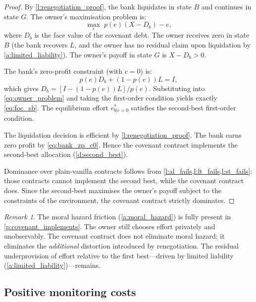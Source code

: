 \documentclass[12pt,a4paper]{article}
\theoremstyle{plain}
\theoremstyle{definition}
\theoremstyle{remark}
\newtheorem{remark}[theorem]{Remark}
\begin{document}
\begin{proof}
By \cref{l:renegotiation_proof}, the bank liquidates in state $B$ and continues in
state $G$. The owner's maximisation problem is:
\begin{equation}
  \max_{e} \; p(e)(X - D_b) - e,
  \label{eq:owner_problem}
\end{equation}
where $D_b$ is the face value of the covenant debt. The owner receives zero in state
$B$ (the bank recovers $L$, and the owner has no residual claim upon liquidation by
\cref{a:limited_liability}). The owner's payoff in state $G$ is $X - D_b > 0$.

The bank's zero-profit constraint (with $c = 0$) is:
\begin{equation}
  p(e) D_b + (1-p(e)) L = I,
  \label{eq:bank_zp_c0}
\end{equation}
which gives $D_b = [I - (1-p(e))L]/p(e)$. Substituting into \cref{eq:owner_problem}
and taking the first-order condition yields exactly \cref{eq:foc_sb}. The equilibrium
effort $e^*_{b|c=0}$ satisfies the second-best first-order condition.

The liquidation decision is efficient by \cref{l:renegotiation_proof}. The bank earns
zero profit by \cref{eq:bank_zp_c0}. Hence the covenant contract implements the
second-best allocation (\cref{d:second_best}).

Dominance over plain-vanilla contracts follows from \cref{l:al_fails,l:lt_fails,l:st_fails}:
those contracts cannot implement the second best, while the covenant contract does.
Since the second-best maximises the owner's payoff subject to the constraints of the
environment, the covenant contract strictly dominates.
\end{proof}

\begin{remark}
\label{r:moral_hazard_survives}
The moral hazard friction (\cref{a:moral_hazard}) is fully present in
\cref{p:covenant_implements}. The owner still chooses effort privately and
unobservably. The covenant contract does not eliminate moral hazard; it eliminates
the \emph{additional} distortion introduced by renegotiation. The residual
underprovision of effort relative to the first best---driven by limited liability
(\cref{a:limited_liability})---remains.
\end{remark}

\subsection{Positive monitoring costs}
\label{subsec:positive_cost}
\end{document}
